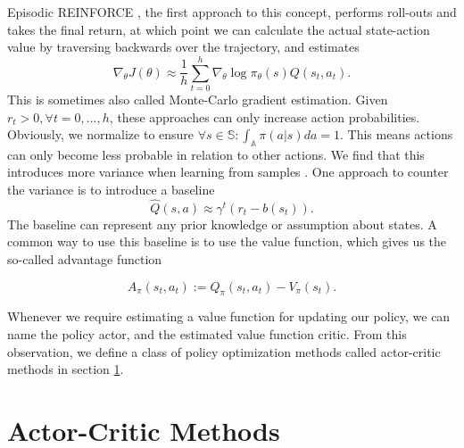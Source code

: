 Episodic REINFORCE \cite{Williams92simplestatistical}, the first approach to this concept, performs roll-outs and takes the final return, at which point we can calculate the actual state-action value by traversing backwards over the trajectory, and estimates
\begin{equation}
  \nabla_\theta J(\theta) \approx \frac{1}{h} \sum_{t=0}^h \nabla_\theta\log\pi_\theta(s) Q(s_t,a_t).
\end{equation}
This is sometimes also called Monte-Carlo gradient estimation. 
Given $r_t > 0, \forall t=0,\dots,h$, these approaches can only increase action probabilities. 
Obviously, we normalize to ensure $\forall s \in \mathbb{S}: \int_\mathbb{A}{\pi(a|s)da} = 1$. 
This means actions can only become less probable in relation to other actions. 
We find that this introduces more variance when learning from samples \cite{Sutton:1999:PGM:3009657.3009806}. 
One approach to counter the variance is to introduce a baseline
\begin{equation}
  \hat{Q}(s,a) \approx \gamma^{t} (r_{t} - b(s_t)).
\end{equation}
The baseline can represent any prior knowledge or assumption about states. 
A common way to use this baseline is to use the value function, which gives us the so-called advantage function

\begin{equation}
	A_{\pi}(s_t, a_t) := Q_{\pi}(s_t, a_t) - V_{\pi}(s_t).
	\label{eqn:adv}
\end{equation}

Whenever we require estimating a value function for updating our policy, we can name the policy actor, and the estimated value function critic. 
From this observation, we define a class of policy optimization methods called actor-critic methods in section \ref{sec:ac}.


\section{Actor-Critic Methods} 
\label{sec:ac}

